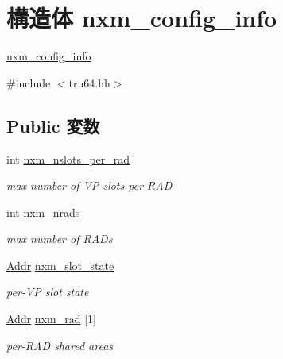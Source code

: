 \hypertarget{structTru64_1_1nxm__config__info}{
\section{構造体 nxm\_\-config\_\-info}
\label{structTru64_1_1nxm__config__info}
}


\hyperlink{structTru64_1_1nxm__config__info}{nxm\_\-config\_\-info}  


{\ttfamily \#include $<$tru64.hh$>$}\subsection*{Public 変数}
\begin{DoxyCompactItemize}
\item 
int \hyperlink{structTru64_1_1nxm__config__info_ae850243d0c164134126c812301a40cb4}{nxm\_\-nslots\_\-per\_\-rad}
\begin{DoxyCompactList}\small\item\em max number of VP slots per RAD \item\end{DoxyCompactList}\item 
int \hyperlink{structTru64_1_1nxm__config__info_a4e9fc0098f3b715006c6e06626842884}{nxm\_\-nrads}
\begin{DoxyCompactList}\small\item\em max number of RADs \item\end{DoxyCompactList}\item 
\hyperlink{base_2types_8hh_af1bb03d6a4ee096394a6749f0a169232}{Addr} \hyperlink{structTru64_1_1nxm__config__info_a5af50da8cac8bb510a64e9e314ac797a}{nxm\_\-slot\_\-state}
\begin{DoxyCompactList}\small\item\em per-\/VP slot state \item\end{DoxyCompactList}\item 
\hyperlink{base_2types_8hh_af1bb03d6a4ee096394a6749f0a169232}{Addr} \hyperlink{structTru64_1_1nxm__config__info_a6f50aa5521412896eb5f261175c5dd7b}{nxm\_\-rad} \mbox{[}1\mbox{]}
\begin{DoxyCompactList}\small\item\em per-\/RAD shared areas \item\end{DoxyCompactList}\end{DoxyCompactItemize}


